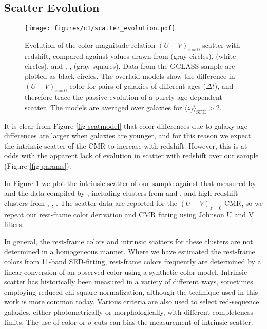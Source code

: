 \subsection{Scatter Evolution}\label{sec-scatevo}

\begin{figure}
\texttt{[image: figures/c1/scatter\_evolution.pdf]}
\caption[Evolution of the color-magnitude relation scatter with redshift, with values drawn from the literature]{Evolution of the color-magnitude relation $(U-V)_{z=0}$ scatter with redshift, compared against values drawn from \citet{Snyder:2012wq} (gray circles), \citet{Hilton:2009nq} (white circles), and \citet{Papovich:2010yj}, \citet{Stanford:2012yi}, \citet{Zeimann:2012bf} (gray squares). Data from the GCLASS sample are plotted as black circles. The overlaid models show the difference in $(U-V)_{z=0}$ color for pairs of galaxies of different ages ($\Delta t$), and therefore trace the passive evolution of a purely age-dependent scatter. The models are averaged over galaxies for $\langle z_f \rangle_\mathrm{SFH} > 2$.
\label{fig-scatter_evolution}}
\end{figure}

It is clear from Figure \ref{fig-scatmodel} that color differences due to galaxy age differences are larger when galaxies are younger, and for this reason we expect the intrinsic scatter of the CMR to increase with redshift. However, this is at odds with the apparent lack of evolution in scatter with redshift over our sample (Figure \ref{fig-params}).

In Figure \ref{fig-scatter_evolution} we plot the intrinsic scatter of our sample against that measured by \citet{Snyder:2012wq} and the data compiled by \citet{Hilton:2009nq}, including clusters from \citet{Mei:2006ec} and \citet{Blakeslee:2003qq}, and high-redshift clusters from \citet{Papovich:2010yj}, \citet{Stanford:2012yi}, \citet{Zeimann:2012bf}. The scatter data are reported for the $(U-V)_{z=0}$ CMR, so we repeat our rest-frame color derivation and CMR fitting using Johnson U and V filters.

In general, the rest-frame colors and intrinsic scatters for these clusters are not determined in a homogeneous manner. Where we have estimated the rest-frame colors from 11-band SED-fitting, rest-frame colors frequently are determined by a linear conversion of an observed color using a synthetic color model. Intrinsic scatter has historically been measured in a variety of different ways, sometimes employing reduced chi-square normalization, although the technique used in this work is more common today. Various criteria are also used to select red-sequence galaxies, either photometrically or morphologically, with different completeness limits. The use of color or $\sigma$ cuts can bias the measurement of intrinsic scatter.

